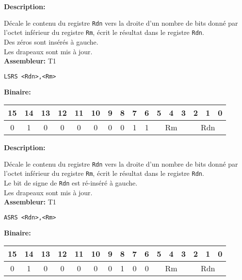 \documentclass{article}
\newcounter{subsubsubsection}[subsubsection]
\begin{document}

\textbf{Description: }

Décale le contenu du registre \texttt{Rdn} vers la droite d'un nombre de bits donné par l'octet inférieur du registre \texttt{Rm}, écrit le résultat dans le registre \texttt{Rdn}.\\
Des zéros sont insérés à gauche.\\
Les drapeaux sont mis à jour.\\

\textbf{Assembleur:} T1

\begin{lstlisting}
LSRS <Rdn>,<Rm>
\end{lstlisting}

\textbf{Binaire:}\\

\begin{tabular}{| c c c c c c c c c c c c c c c c |}
\hline
15 & 14 & 13 & 12 & 11 & 10 & \multicolumn{1}{|c}{9} & 8 & 7 & 6 & \multicolumn{1}{|c}{5} & 4 & 3 & \multicolumn{1}{|c}{2} & 1 & 0 \\
\hline
0 & 1 & 0 & 0 & 0 & 0 & \multicolumn{1}{|c}{0} & 0 & 1 & 1 & \multicolumn{3}{|c}{Rm} & \multicolumn{3}{|c|}{Rdn} \\
\hline
\end{tabular}



\textbf{Description: }

Décale le contenu du registre \texttt{Rdn} vers la droite d'un nombre de bits donné par l'octet inférieur du registre \texttt{Rm}, écrit le résultat dans le registre \texttt{Rdn}.\\
Le bit de signe de \texttt{Rdn} est ré-inséré à gauche.\\
Les drapeaux sont mis à jour.\\

\textbf{Assembleur:} T1

\begin{lstlisting}
ASRS <Rdn>,<Rm>
\end{lstlisting}

\textbf{Binaire:}\\

\begin{tabular}{| c c c c c c c c c c c c c c c c |}
\hline
15 & 14 & 13 & 12 & 11 & 10 & \multicolumn{1}{|c}{9} & 8 & 7 & 6 & \multicolumn{1}{|c}{5} & 4 & 3 & \multicolumn{1}{|c}{2} & 1 & 0 \\
\hline
0 & 1 & 0 & 0 & 0 & 0 & \multicolumn{1}{|c}{0} & 1 & 0 & 0 & \multicolumn{3}{|c}{Rm} & \multicolumn{3}{|c|}{Rdn} \\
\hline
\end{tabular}
\end{document}
